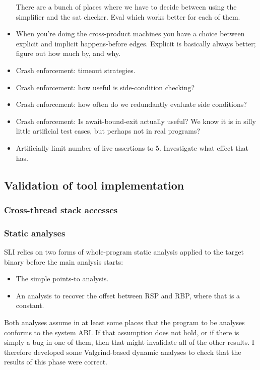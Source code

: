 \begin{itemize}
  There are a bunch of places where we have to decide between using the simplifier and the sat checker.
  Eval which works better for each of them.
\item
  When you're doing the cross-product machines you have a choice between explicit and implicit happens-before edges.
  Explicit is basically always better; figure out how much by, and why.
\item
  Crash enforcement: timeout strategies.
\item
  Crash enforcement: how useful is side-condition checking?
\item
  Crash enforcement: how often do we redundantly evaluate side conditions?
\item
  Crash enforcement: Is await-bound-exit actually useful?
  We know it is in silly little artificial test cases, but perhaps not in real programs?
\item
  Artificially limit number of live assertions to 5.
  Investigate what effect that has.
\end{itemize}

\subsection{Validation of tool implementation}

\subsubsection{Cross-thread stack accesses}

\subsubsection{Static analyses}

SLI relies on two forms of whole-program static analysis applied to the target binary before the main analysis starts:

\begin{itemize}
\item
  The simple points-to analysis.
\item
  An analysis to recover the offset between RSP and RBP, where that is a constant.
\end{itemize}

Both analyses assume in at least some places that the program to be analyses conforms to the system ABI.
If that assumption does not hold, or if there is simply a bug in one of them, then that might invalidate all of the other results.
I therefore developed some Valgrind-based dynamic analyses to check that the results of this phase were correct.

